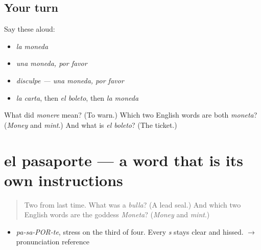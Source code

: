 \subsection*{Your turn}
Say these aloud:

\begin{itemize}
\raggedright
  \item \emph{la moneda}
  \item \emph{una moneda, por favor}
  \item \emph{disculpe — una moneda, por favor}
  \item \emph{la carta}, then \emph{el boleto}, then \emph{la moneda}
\end{itemize}

\begin{tcolorbox}[breakable,colback=teal!4,colframe=teal!35!black,title={Before you move on}]
What did \emph{monere} mean? (To warn.) Which two English words are both \emph{moneta}? (\emph{Money} and \emph{mint}.) And what is \emph{el boleto}? (The ticket.)
\end{tcolorbox}
\section[el pasaporte]{el pasaporte — a word that is its own instructions}

\label{lesson:ES-C313-pasaporte}



\begin{quote}
Two from last time. What was a \emph{bulla}? (A lead seal.) And which two English words are the goddess \emph{Moneta}? (\emph{Money} and \emph{mint}.)
\end{quote}

\begin{sounds}
\begin{itemize}
\raggedright
  \item \emph{pa-sa-POR-te}, stress on the third of four. Every \emph{s} stays clear and hissed. $\to$ pronunciation reference
\end{itemize}
\end{sounds}

